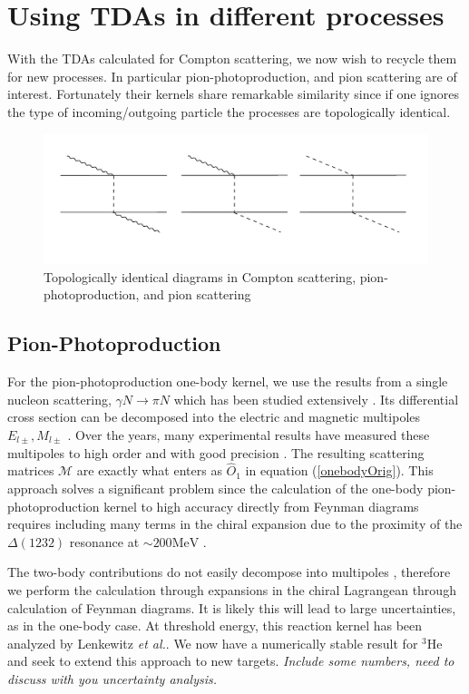 \documentclass[a4paper,11pt]{article}
\newcommand{\etal}{\textit{et al.}}
\newcommand{\HeT}{{}^{3} \mathrm{He}}
\newcommand{\ques}[1]{\color{red}\textit{ #1 }\color{black}}
\newcommand{\MeV}{\mathrm{MeV}}
\begin{document}
\section{Using TDAs in different processes}
With the TDAs calculated for Compton scattering, we now wish to recycle them for new processes.
In particular pion-photoproduction, and
pion scattering are of interest.
Fortunately their kernels share remarkable similarity since if one ignores the type of incoming/outgoing 
particle the processes are topologically identical.
\begin{figure}[H]
\centering
\includegraphics[scale=0.5]{KernelSim.pdf}
\caption{Topologically identical diagrams in Compton scattering, pion-photoproduction, and pion scattering}
\end{figure}
\subsection{Pion-Photoproduction}
For the pion-photoproduction one-body kernel, we use the results from
a single nucleon scattering, $\gamma N \to \pi N$ which has
been studied extensively \cite{pionphoto,
Rijneveen2021,Workman2012,Briscoe2023}.
Its differential cross section can be decomposed into the
electric and magnetic multipoles $E_{l\pm}, M_{l\pm}$ \cite{pionphoto}.
Over the years, many experimental results have measured
these multipoles to high order and with good precision
\cite{multipolePionPion}.
The resulting scattering matrices $\mathcal{M}$ are exactly what
enters as $\hat{O}_1$ in equation (\ref{onebodyOrig}).
This approach solves a significant problem since the calculation of
the one-body pion-photoproduction kernel
to high accuracy directly from Feynman diagrams requires including many terms
in the chiral expansion due to the proximity of the $\Delta(1232)$ resonance at $\sim 200\MeV$ \cite{Rijneveen2021}.


The two-body contributions do not easily decompose into multipoles
, therefore we perform the calculation through expansions
in the chiral Lagrangean through calculation of Feynman diagrams.
It is likely this will lead to large uncertainties, as in the one-body case.
At threshold energy, this reaction kernel has been analyzed by
Lenkewitz \etal \cite{L2011, L2013}.
We now have a numerically stable result for $\HeT$ and seek to extend
this approach to new targets.
\ques{Include some numbers, need to discuss with you uncertainty analysis.}
\end{document}

